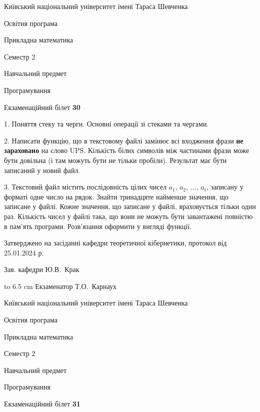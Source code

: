\documentclass[12pt, ukrainian]{article}
\begin{document}
\vspace{0.9cm}
{{\begin {scriptsize}\par
{ \center  Київський національний університет імені Тараса Шевченка \par}
{\parbox {5 cm}{Освітня програма \hfill}{\parbox {7 cm}{Прикладна математика\hfill}}\parbox {6 cm}{\hfill Семестр 2}}\par
{\parbox {5 cm} {Навчальний предмет \hfill}\parbox {7 cm}{Програмування \hfill}\parbox {6cm}{\hfill}\par}\vspace{-15pt} \end{scriptsize}}{\center Екзаменаційний білет \No \textbf { 30 }\par}}
{%
1. Поняття стеку та черги. Основні операції зі стеками та чергами.%
\par
2. Написати функцію, що в текстовому файлі замінює всі входження фрази \textbf{не зараховано} на слово UPS. Кількість білих символів між частинами фрази може бути довільна (і там можуть бути не тільки пробіли). Результат має бути записаний у новий файл.

\par
3. Текстовий файл містить послідовність цілих чисел $a_1$, $a_2$, $\ldots$, $a_t$, записану у форматі одне число на рядок. Знайти тринадцяте найменше значення, що записане у файлі. Кожне значення, що записане у файлі, враховується тільки один раз. Кількість чисел у файлі така, що вони не можуть бути завантажені повністю в пам'ять програми. Розв'язання оформити у вигляді функції.

}
{\smallskip\smallskip \begin {scriptsize} Затверджено на засіданні кафедри теоретичної кібернетики, протокол   від   25.01.2024 р.\par\smallskip\smallskip\smallskip\smallskip
{\parbox {6.5 cm} {Зав. кафедри \dotfill Ю.В.~Крак}}\hspace {0.7cm} {\hbox to 6.5 cm { Екзаменатор \dotfill Т.О.~Карнаух}} \end{scriptsize}}
\newpage
{{\begin {scriptsize}\par
{ \center  Київський національний університет імені Тараса Шевченка \par}
{\parbox {5 cm}{Освітня програма \hfill}{\parbox {7 cm}{Прикладна математика\hfill}}\parbox {6 cm}{\hfill Семестр 2}}\par
{\parbox {5 cm} {Навчальний предмет \hfill}\parbox {7 cm}{Програмування \hfill}\parbox {6cm}{\hfill}\par}\vspace{-15pt} \end{scriptsize}}{\center Екзаменаційний білет \No \textbf { 31 }\par}}
\end{document}
